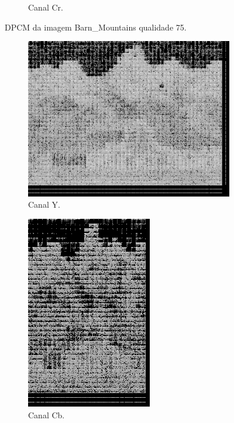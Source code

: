 \documentclass[a4paper, 12pt]{article}
\begin{document}
\begin{figure}[H]
\begin{subfigure}{0.3\textwidth}
                \caption{ Canal Cr.}
            \end{subfigure}
            \caption{\label{fig:my_label} DPCM da imagem Barn\_Mountains qualidade 75.}
        \end{figure}
        \begin{figure}[H]
            \begin{subfigure}{0.3\textwidth}
                \centering
                \includegraphics[scale=0.5] {resources/DPCM/Y_DPCM100.png}
                \caption{ Canal Y.}
            \end{subfigure}
            \hfill
            \begin{subfigure}{0.3\textwidth}
                \centering 
                \includegraphics[scale=0.5]{resources/DPCM/CB_DPCM100.png}
                \caption{ Canal Cb.}
            \end{subfigure}
            \hfill
            \begin{subfigure}{0.3\textwidth}

\end{subfigure}
\end{figure}
\end{document}
